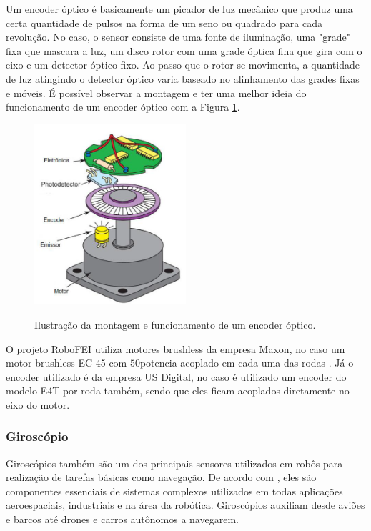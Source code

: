 \documentclass[acronym, symbols, table]{fei}
\begin{document}
				Um encoder óptico é basicamente um picador de luz mecânico que produz uma certa quantidade de pulsos na forma de um seno ou quadrado para cada revolução. No caso, o sensor consiste de uma fonte de iluminação, uma "grade" fixa que mascara a luz, um disco rotor com uma grade óptica fina que gira com o eixo e um detector óptico fixo. Ao passo que o rotor se movimenta, a quantidade de luz atingindo o detector óptico varia baseado no alinhamento das grades fixas e móveis. É possível observar a montagem e ter uma melhor ideia do funcionamento de um encoder óptico com a Figura \ref{fig:optical_encoder}.
				
				\begin{figure}[!htb]
					\centering
					\caption{Ilustração da montagem e funcionamento de um encoder óptico.} 
					\includegraphics[width=0.5\textwidth]{encoder_optico.png}
					\label{fig:optical_encoder}
				\end{figure}
				
				O projeto RoboFEI utiliza motores brushless da empresa Maxon\textregistered, no caso um motor brushless EC 45 com $50$\gls{potencia} acoplado em cada uma das rodas \cite{ec45_maxon}. Já o encoder utilizado é da empresa US Digital\textregistered \cite{e4t_encoder}, no caso é utilizado um encoder do modelo E4T por roda também, sendo que eles ficam acoplados diretamente no eixo do motor.
			
			\subsubsection{Giroscópio}
			
				Giroscópios também são um dos principais sensores utilizados em robôs para realização de tarefas básicas como navegação. De acordo com \textcite{jeremydingman2020}, eles são componentes essenciais de sistemas complexos utilizados em todas aplicações aeroespaciais, industriais e na área da robótica. Giroscópios auxiliam desde aviões e barcos até drones e carros autônomos a navegarem.
				
\end{document}
